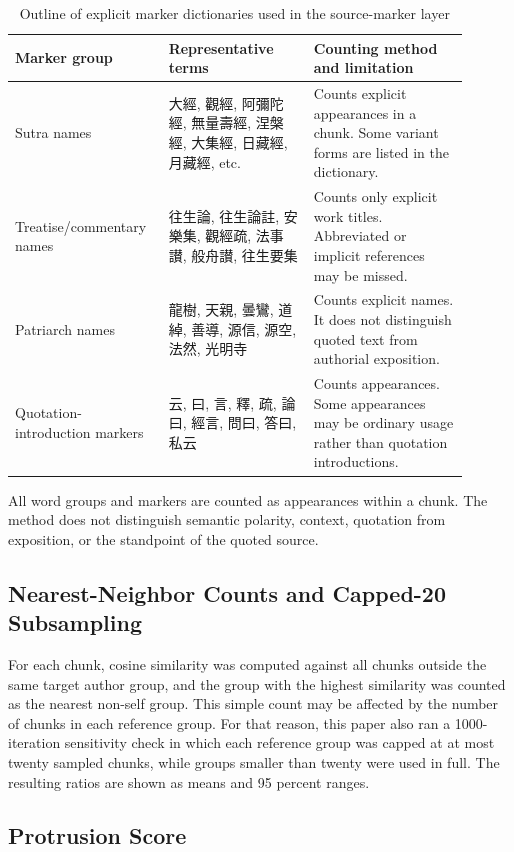 \documentclass[uplatex,dvipdfmx,11pt,a4paper]{jsarticle}
\begin{document}
\begin{table}[H]
\centering
\footnotesize
\setlength{\tabcolsep}{2pt}
\caption{Outline of explicit marker dictionaries used in the source-marker layer}
\label{tab:source-marker-lexicon}
\begin{tabular}{@{}p{0.28\linewidth}p{0.30\linewidth}p{0.32\linewidth}@{}}
\toprule
Marker group & Representative terms & Counting method and limitation \\
\midrule
Sutra names & 大經, 觀經, 阿彌陀經, 無量壽經, 涅槃經, 大集經, 日藏經, 月藏經, etc. & Counts explicit appearances in a chunk. Some variant forms are listed in the dictionary. \\
Treatise/commentary names & 往生論, 往生論註, 安樂集, 觀經疏, 法事讃, 般舟讃, 往生要集 & Counts only explicit work titles. Abbreviated or implicit references may be missed. \\
Patriarch names & 龍樹, 天親, 曇鸞, 道綽, 善導, 源信, 源空, 法然, 光明寺 & Counts explicit names. It does not distinguish quoted text from authorial exposition. \\
Quotation-introduction markers & 云, 曰, 言, 釋, 疏, 論曰, 經言, 問曰, 答曰, 私云 & Counts appearances. Some appearances may be ordinary usage rather than quotation introductions. \\
\bottomrule
\end{tabular}
\end{table}

All word groups and markers are counted as appearances within a chunk. The method does not distinguish semantic polarity, context, quotation from exposition, or the standpoint of the quoted source.

\subsection{Nearest-Neighbor Counts and Capped-20 Subsampling}

For each chunk, cosine similarity was computed against all chunks outside the same target author group, and the group with the highest similarity was counted as the nearest non-self group. This simple count may be affected by the number of chunks in each reference group. For that reason, this paper also ran a 1000-iteration sensitivity check in which each reference group was capped at at most twenty sampled chunks, while groups smaller than twenty were used in full. The resulting ratios are shown as means and 95 percent ranges.

\subsection{Protrusion Score}
\end{document}
